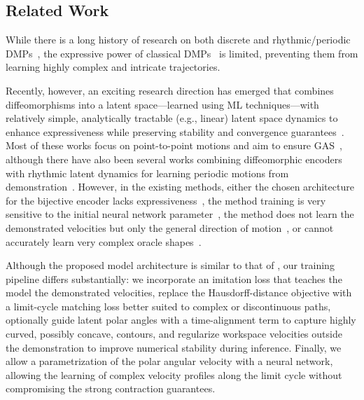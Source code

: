 \subsection{Related Work}
While there is a long history of research on both discrete and rhythmic/periodic \glspl{DMP}~\citep{ijspeert2002learning, kober2009learning, ijspeert2013dynamical, wensing2017sparse, kramberger2018passivity, saveriano2023dynamic, abu2024learning, hu2024fusion, nah2025combining}, the expressive power of classical \glspl{DMP}~\citep{ijspeert2002learning, kober2009learning, ijspeert2013dynamical, wensing2017sparse} is limited, preventing them from learning highly complex and intricate trajectories.

Recently, however, an exciting research direction has emerged that combines diffeomorphisms into a latent space—learned using ML techniques—with relatively simple, analytically tractable (e.g., linear) latent space dynamics to enhance expressiveness while preserving stability and convergence guarantees~\citep{rana2020euclideanizing, urain2020imitationflow, zhang2022learning, perez2023stable}. Most of these works focus on point-to-point motions and aim to ensure \gls{GAS}~\citep{rana2020euclideanizing, zhang2022learning, perez2023stable, perez2024puma}, although there have also been several works combining diffeomorphic encoders with rhythmic latent dynamics for learning periodic motions from demonstration~\citep{urain2020imitationflow, khadivar2021learning, zhi2024teaching}.
However, in the existing methods, either the chosen architecture for the bijective encoder lacks expressiveness~\citep{urain2020imitationflow, khadivar2021learning}, the method training is very sensitive to the initial neural network parameter~\citep{urain2020imitationflow}, the method does not learn the demonstrated velocities but only the general direction of motion~\citep{zhi2024teaching}, or cannot accurately learn very complex oracle shapes~\citep{zhi2024teaching}.

Although the proposed model architecture is similar to that of \citet{zhi2024teaching}, our training pipeline differs substantially: we incorporate an imitation loss that teaches the model the demonstrated velocities, replace the Hausdorff-distance objective with a limit-cycle matching loss better suited to complex or discontinuous paths, optionally guide latent polar angles with a time-alignment term to capture highly curved, possibly concave, contours, and regularize workspace velocities outside the demonstration to improve numerical stability during inference. 
Finally, we allow a parametrization of the polar angular velocity with a neural network, allowing the learning of complex velocity profiles along the limit cycle without compromising the strong contraction guarantees. 

